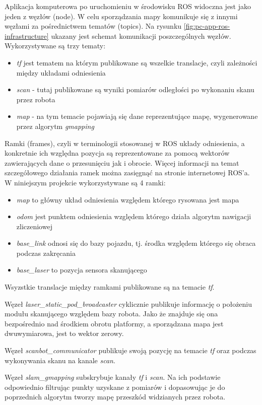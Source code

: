 Aplikacja komputerowa po uruchomieniu w środowisku ROS widoczna jest jako jeden z węzłów (node). W celu sporządzania mapy komunikuje się z innymi węzłami za pośrednictwem tematów (topics).
Na rysunku \ref{fig:pc-app-ros-infrastructure} ukazany jest schemat komunikacji poszczególnych węzłów.
Wykorzystywane są trzy tematy:
\begin{itemize}
    \item \emph{tf} jest tematem na którym publikowane są wszelkie translacje, czyli zależności między układami odniesienia
    \item \emph{scan} - tutaj publikowane są wyniki pomiarów odległości po wykonaniu skanu przez robota
    \item \emph{map} - na tym temacie pojawiają się dane reprezentujące mapę, wygenerowane przez algorytm \emph{gmapping}\cite{Grisetti2005}\cite{gmapping-website}\cite{gmapping-ros}
\end{itemize}

Ramki (frames), czyli w terminologii stosowanej w ROS układy odniesienia, a konkretnie ich względna pozycja są reprezentowane za pomocą wektorów zawierających dane o przesunięciu jak i obrocie. Więcej informacji na temat szczegółowego działania ramek można zasięgnąć na stronie internetowej ROS'a\cite{ros}. W niniejszym projekcie wykorzystywane są 4 ramki:
\begin{itemize}
    \item \emph{map} to główny układ odniesienia względem którego rysowana jest mapa
    \item \emph{odom} jest punktem odniesienia względem którego działa algorytm nawigacji zliczeniowej
    \item \emph{base\_link} odnosi się do bazy pojazdu, tj. środka względem którego się obraca podczas zakręcania
    \item \emph{base\_laser} to pozycja sensora skanującego
\end{itemize}
Wsyzstkie translacje między ramkami publikowane są na temacie \emph{tf}.

Węzeł \emph{laser\_static\_pod\_broadcaster} cyklicznie publikuje informację o położeniu modułu skanującego względem bazy robota. Jako że znajduje się ona bezpośrednio nad środkiem obrotu platformy, a sporządzana mapa jest dwuwymiarowa, jest to wektor zerowy.

Węzeł \emph{scanbot\_communicator} publikuje swoją pozycję na temacie \emph{tf} oraz podczas wykonywania skanu na kanale \emph{scan}.

Węzeł \emph{slam\_gmapping} subskrybuje kanały \emph{tf} i \emph{scan}. Na ich podstawie odpowiednio filtrując punkty uzyskane z pomiarów i dopasowując je do poprzednich algorytm tworzy mapę przeszkód widzianych przez robota.

